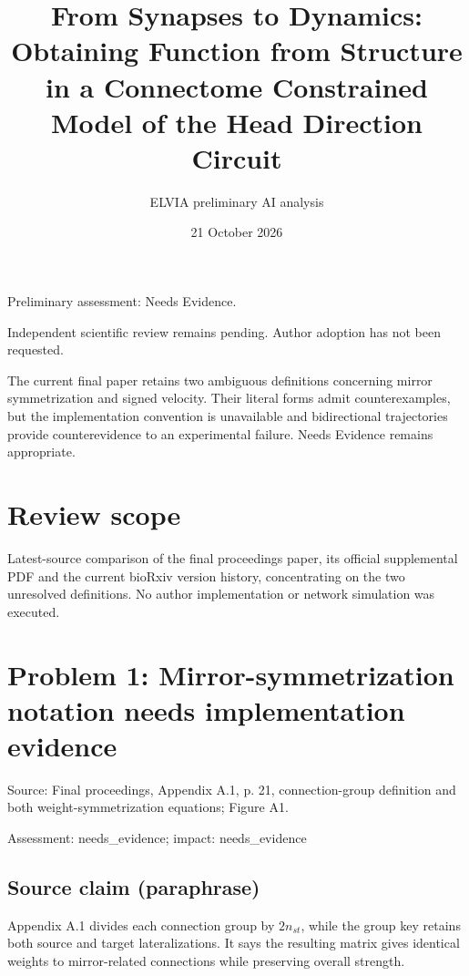 \documentclass[11pt]{article}
\begin{document}
\title{From Synapses to Dynamics: Obtaining Function from Structure in a Connectome Constrained Model of the Head Direction Circuit}

\author{ELVIA preliminary AI analysis}\date{21 October 2026}\maketitle

Preliminary assessment: Needs Evidence.\par

Independent scientific review remains pending. Author adoption has not been requested.

The current final paper retains two ambiguous definitions concerning mirror symmetrization and signed velocity. Their literal forms admit counterexamples, but the implementation convention is unavailable and bidirectional trajectories provide counterevidence to an experimental failure. Needs Evidence remains appropriate.

\section*{Review scope}

Latest-source comparison of the final proceedings paper, its official supplemental PDF and the current bioRxiv version history, concentrating on the two unresolved definitions. No author implementation or network simulation was executed.

\section*{Problem 1: Mirror-symmetrization notation needs implementation evidence}

Source: Final proceedings, Appendix A.1, p. 21, connection-group definition and both weight-symmetrization equations; Figure A1.

Assessment: needs\_evidence; impact: needs\_evidence

\subsection*{Source claim (paraphrase)}

Appendix A.1 divides each connection group by \(2n_{st}\), while the group key retains both source and target lateralizations. It says the resulting matrix gives identical weights to mirror-related connections while preserving overall strength.
\end{document}
